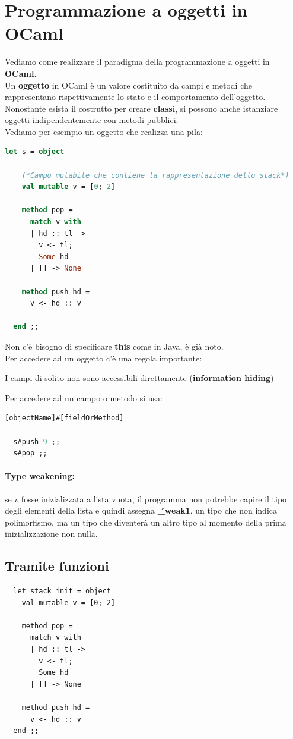 \documentclass[12pt,a4paper]{article}
\let\oldsection\section
\renewcommand{\section}{\clearpage\oldsection}
\begin{document}
\section{Programmazione a oggetti in OCaml}
Vediamo come realizzare il paradigma della programmazione a oggetti in \textbf{OCaml}.\\
Un \textbf{oggetto} in OCaml è un valore costituito da campi e metodi che rappresentano rispettivamente lo stato e il comportamento dell'oggetto.\\
Nonostante esista il costrutto per creare \textbf{classi}, si possono anche istanziare oggetti indipendentemente con metodi pubblici.\\
Vediamo per esempio un oggetto che realizza una pila:
\begin{lstlisting}[language=OCaml]
  let s = object

    (*Campo mutabile che contiene la rappresentazione dello stack*)
    val mutable v = [0; 2]

    method pop = 
      match v with
      | hd :: tl ->
        v <- tl;
        Some hd
      | [] -> None

    method push hd = 
      v <- hd :: v

  end ;;
\end{lstlisting}
Non c'è bisogno di specificare \textbf{this} come in Java, è già noto.\\
Per accedere ad un oggetto c'è una regola importante:
\begin{center}
I campi di solito non sono accessibili direttamente (\textbf{information hiding})
\end{center}
Per accedere ad un campo o metodo si usa:
\begin{lstlisting}[language=OCaml]
  [objectName]#[fieldOrMethod]

  s#push 9 ;;
  s#pop ;;
\end{lstlisting}
\paragraph{Type weakening:} se $v$ fosse inizializzata a lista vuota, il programma non potrebbe capire il tipo degli elementi della lista e quindi assegna \textbf{\'\_weak1}, un tipo che non indica polimorfismo, ma un tipo che diventerà un altro tipo al momento della prima inizializzazione non nulla.
\subsection{Tramite funzioni}
\begin{lstlisting}
  let stack init = object
    val mutable v = [0; 2]

    method pop = 
      match v with
      | hd :: tl ->
        v <- tl;
        Some hd
      | [] -> None

    method push hd = 
      v <- hd :: v
  end ;;
\end{lstlisting}
\end{document}
